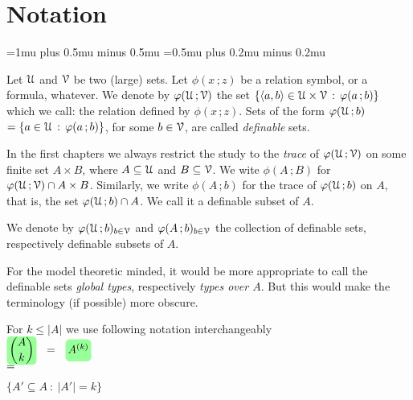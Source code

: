 \documentclass[scombinatorics.tex]{subfiles}
\begin{document}
\chapter*{Notation}

\label{minimax}


\def\medrel#1{\parbox[t]{6ex}{$\displaystyle\hfil #1$}}
\def\ceq#1#2#3{\parbox[t]{25ex}{$\displaystyle #1$}\medrel{#2}{$\displaystyle #3$}}

\thickmuskip=1mu plus 0.5mu minus 0.5mu
\medmuskip=0.5mu plus 0.2mu minus 0.2mu

Let $\EuScript U$ and $\EuScript V$ be two (large) sets.
Let $\phi(x\,;z)$ be a relation symbol, or a formula, whatever.
We denote by \emph{$\varphi(\EuScript U\,;\EuScript V)$\/} the set $\{\langle a,b\rangle\in\EuScript U\times\EuScript V\, :\, \varphi(a\,;b)\}$ which we call: the relation defined by $\phi(x\,;z)$.
Sets of the form \emph{$\varphi(\EuScript U\,;b)$}$=\{a\in\EuScript U\,:\, \varphi(a\,;b)\}$, for some $b\in\EuScript V$, are called \emph{definable\/} sets.


In the first chapters we always restrict the study to the \emph{trace\/} of $\varphi(\EuScript U\,;\EuScript V)$ on some finite set $A\times B$, where $A\subseteq\EuScript U$ and $B\subseteq\EuScript V$. 
We wite $\phi(A\,;B)$ for $\varphi(\EuScript U\,;\EuScript V)\cap A\times B$.
Similarly, we write $\phi(A\,;b)$ for the trace of $\varphi(\EuScript U\,;b)$ on $A$, that is, the set $\varphi(\EuScript U\,;b)\cap A$.
We call it a definable subset of $A$.

We denote by \emph{$\varphi(\EuScript U\,;b)_{b\in\EuScript V}$} and \emph{$\varphi(A\,;b)_{b\in\EuScript V}$} the collection of definable sets, respectively definable subsets of $A$.

For the model theoretic minded, it would be more appropriate to call the definable sets \textit{global types}, respectively \textit{types over $A$}.
But this would make the terminology (if possible) more obscure.

For $k\le|A|$ we use following notation interchangeably

\ceq{\hfill\emph{$\displaystyle{A\choose k}$}\medrel{=}\emph{$\vphantom{\Big[}A^{(k)}$}}
{=}
{\Big\{A'\subseteq A\ :\ |A'|=k \Big\}}
\end{document}
